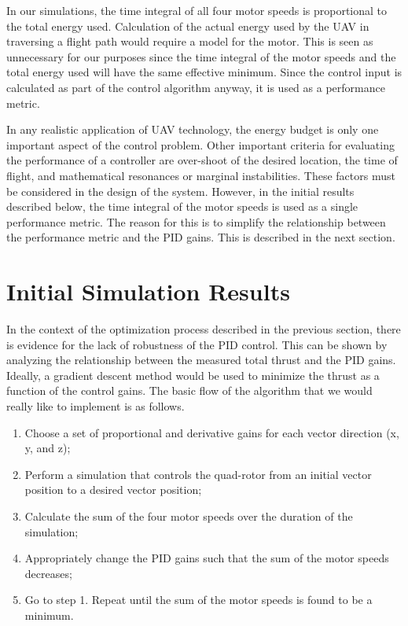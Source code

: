 In our simulations, the time integral of all four motor speeds is proportional to the total energy used. Calculation of the actual energy used by the UAV in traversing a flight path would require a model for the motor. This is seen as unnecessary for our purposes since the time integral of the motor speeds and the total energy used will have the same effective minimum. Since the control input is calculated as part of the control algorithm anyway, it is used as a performance metric.


In any realistic application of UAV technology, the energy budget is only one important aspect of the control problem. Other important criteria for evaluating the performance of a controller are over-shoot of the desired location, the time of flight, and mathematical resonances or marginal instabilities. These factors must be considered in the design of the system. However, in the initial results described below, the time integral of the motor speeds is used as a single performance metric. The reason for this is to simplify the relationship between the performance metric and the PID gains. This is described in the next section.


\section{Initial Simulation Results}

In the context of the optimization process described in the previous section, there is evidence for the lack of robustness of the PID control. This can be shown by analyzing the relationship between the measured total thrust and the PID gains. Ideally, a gradient descent method would be used to minimize the thrust as a function of the control gains. The basic flow of the algorithm that we would really like to implement is as follows.


\begin{enumerate}
\item Choose a set of proportional and derivative gains for each vector direction (x, y, and z);
\item Perform a simulation that controls the quad-rotor from an initial vector position to a desired vector position;
\item Calculate the sum of the four motor speeds over the duration of the simulation;
\item Appropriately change the PID gains such that the sum of the motor speeds decreases;
\item Go to step 1. Repeat until the sum of the motor speeds is found to be a minimum.
\end{enumerate}


